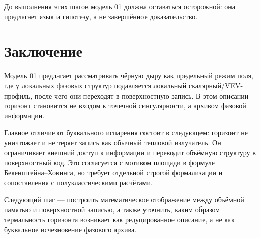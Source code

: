 \documentclass[11pt,a4paper]{article}
\begin{document}
До выполнения этих шагов модель 01 должна оставаться осторожной: она предлагает язык и гипотезу, а не завершённое доказательство.

\section{Заключение}

Модель 01 предлагает рассматривать чёрную дыру как предельный режим поля, где у локальных фазовых структур подавляется локальный скалярный/VEV-профиль, после чего они переходят в поверхностную запись. В этом описании горизонт становится не входом к точечной сингулярности, а архивом фазовой информации.

Главное отличие от буквального испарения состоит в следующем: горизонт не уничтожает и не теряет запись как обычный тепловой излучатель. Он ограничивает внешний доступ к информации и переводит объёмную структуру в поверхностный код. Это согласуется с мотивом площади в формуле Бекенштейна--Хокинга, но требует отдельной строгой формализации и сопоставления с полуклассическими расчётами.

Следующий шаг --- построить математическое отображение между объёмной памятью и поверхностной записью, а также уточнить, каким образом термальность горизонта возникает как редуцированное описание, а не как буквальное исчезновение фазового архива.
\end{document}
